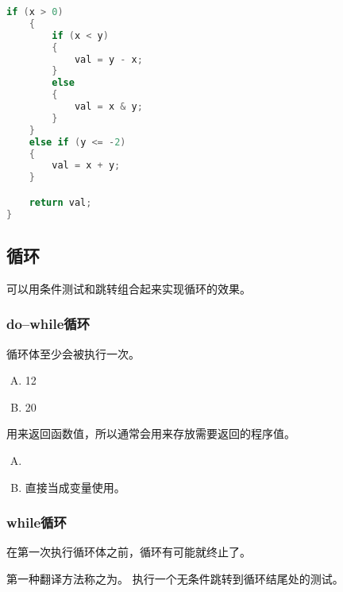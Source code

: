 {{\begin{practicec}
\begin{lstlisting}[language=C]
    if (x > 0)
    {
        if (x < y)
        {
            val = y - x;
        }
        else
        {
            val = x & y;
        }
    }
    else if (y <= -2)
    {
        val = x + y;
    }

    return val;
}
            \end{lstlisting}
        \end{practicec}
    }

    \subsection{循环}
    {
        可以用条件测试和跳转组合起来实现循环的效果。

        \subsubsection{do--while循环}
        {
            循环体至少会被执行一次。

            \begin{practicec}
                \begin{enumerate}[A.]
                    \item 12
                    \item 20
                \end{enumerate}
            \end{practicec}

            用来返回函数值，所以通常会用来存放需要返回的程序值。

            \begin{practicec}
                \begin{enumerate}[A.]
                    \item {}
                    \item 直接当成变量使用。
                \end{enumerate}
            \end{practicec}
        }

        \subsubsection{while循环}
        {
            在第一次执行循环体之前，循环有可能就终止了。

            第一种翻译方法称之为。
            执行一个无条件跳转到循环结尾处的测试。

}}}
